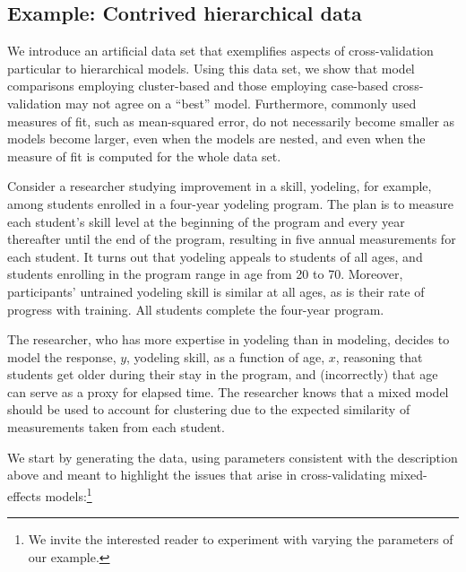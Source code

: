 \documentclass[
]{jss}
\begin{document}
\hypertarget{example-contrived-hierarchical-data}{%
\subsection{Example: Contrived hierarchical
data}\label{example-contrived-hierarchical-data}}

We introduce an artificial data set that exemplifies aspects of
cross-validation particular to hierarchical models. Using this data set,
we show that model comparisons employing cluster-based and those
employing case-based cross-validation may not agree on a ``best'' model.
Furthermore, commonly used measures of fit, such as mean-squared error,
do not necessarily become smaller as models become larger, even when the
models are nested, and even when the measure of fit is computed for the
whole data set.

Consider a researcher studying improvement in a skill, yodeling, for
example, among students enrolled in a four-year yodeling program. The
plan is to measure each student's skill level at the beginning of the
program and every year thereafter until the end of the program,
resulting in five annual measurements for each student. It turns out
that yodeling appeals to students of all ages, and students enrolling in
the program range in age from 20 to 70. Moreover, participants'
untrained yodeling skill is similar at all ages, as is their rate of
progress with training. All students complete the four-year program.

The researcher, who has more expertise in yodeling than in modeling,
decides to model the response, \(y\), yodeling skill, as a function of
age, \(x\), reasoning that students get older during their stay in the
program, and (incorrectly) that age can serve as a proxy for elapsed
time. The researcher knows that a mixed model should be used to account
for clustering due to the expected similarity of measurements taken from
each student.

We start by generating the data, using parameters consistent with the
description above and meant to highlight the issues that arise in
cross-validating mixed-effects models:\footnote{We invite the interested
  reader to experiment with varying the parameters of our example.}
\end{document}

